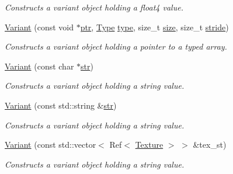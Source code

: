 \begin{DoxyCompactItemize}
\begin{DoxyCompactList}\small\item\em Constructs a variant object holding a float4 value. \item\end{DoxyCompactList}\item 
\hyperlink{structembree_1_1_variant_ae0f6105646bbe545583d28142bc8d694}{Variant} (const void $\ast$\hyperlink{structembree_1_1_variant_abee4587142dc55fee814fddb904bd88a}{ptr}, \hyperlink{structembree_1_1_variant_a10807086db8e8d61a05b0730b496e26b}{Type} \hyperlink{structembree_1_1_variant_a23d594de4575ead4ffdbb2e0bfef522c}{type}, size\_\-t \hyperlink{structembree_1_1_variant_a8e91a7eeadcecfa5e907ee8427a777e6}{size}, size\_\-t \hyperlink{structembree_1_1_variant_a3c6661cb3c0aa893fe61c3832862e46e}{stride})
\begin{DoxyCompactList}\small\item\em Constructs a variant object holding a pointer to a typed array. \item\end{DoxyCompactList}\item 
\hyperlink{structembree_1_1_variant_a471a0d6872167eca764b1167a526b58a}{Variant} (const char $\ast$\hyperlink{structembree_1_1_variant_ae4163ae1235b6a41f2db49c2de56796e}{str})
\begin{DoxyCompactList}\small\item\em Constructs a variant object holding a string value. \item\end{DoxyCompactList}\item 
\hyperlink{structembree_1_1_variant_a928db9938f2dd71d7856d9161a491c7b}{Variant} (const std::string \&\hyperlink{structembree_1_1_variant_ae4163ae1235b6a41f2db49c2de56796e}{str})
\begin{DoxyCompactList}\small\item\em Constructs a variant object holding a string value. \item\end{DoxyCompactList}\item 
\hyperlink{structembree_1_1_variant_a921cb8dc5547bc03f1bc9e4b296e56af}{Variant} (const std::vector$<$ Ref$<$ \hyperlink{classembree_1_1_texture}{Texture} $>$ $>$ \&tex\_\-st)
\begin{DoxyCompactList}\small\item\em Constructs a variant object holding a string value. \item\end{DoxyCompactList}\item 

\end{DoxyCompactItemize}
